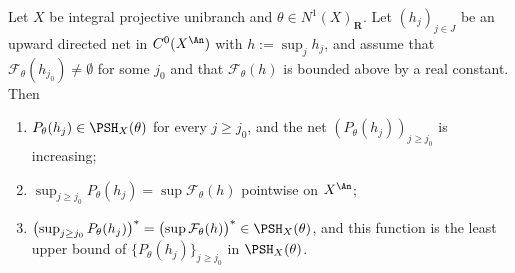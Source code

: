 \begin{theorem}
\label{thm:ch45-increasing-obstacles}
Let $X$ be integral projective unibranch and
$\theta\in N^1(X)_{\mathbf R}$.  Let $(h_j)_{j\in J}$ be an upward
directed net in $C^0(X^{\An})$ with $h:=\sup_jh_j$, and assume that
$\mathcal F_\theta(h_{j_0})\ne\emptyset$ for some $j_0$ and that
$\mathcal F_\theta(h)$ is bounded above by a real constant.  Then
\begin{enumerate}
\item\label{itm:ch45-inc:psh}
      $P_\theta(h_j)\in\PSH_X(\theta)$ for every $j\ge j_0$, and the net
      $(P_\theta(h_j))_{j\ge j_0}$ is increasing;
\item\label{itm:ch45-inc:sup}
      $\sup_{j\ge j_0}P_\theta(h_j)=\sup\mathcal F_\theta(h)$ pointwise on
      $X^{\An}$;
\item\label{itm:ch45-inc:star}
      $\bigl(\sup_{j\ge j_0}P_\theta(h_j)\bigr)^*
       =\bigl(\sup\mathcal F_\theta(h)\bigr)^*\in\PSH_X(\theta)$, and this
      function is the least upper bound of $\{P_\theta(h_j)\}_{j\ge j_0}$ in
      $\PSH_X(\theta)$.
\end{enumerate}
\end{theorem}

